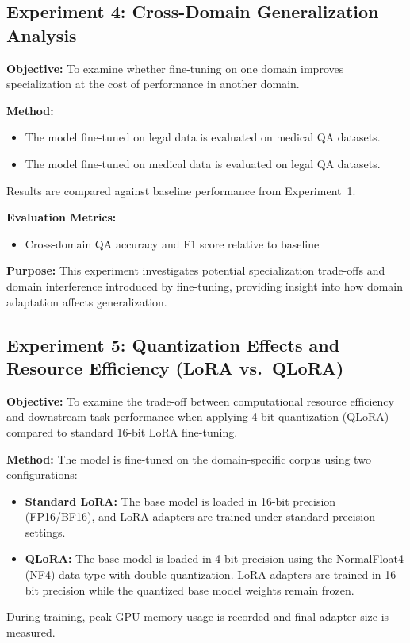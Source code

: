 \documentclass[12pt, letterpaper]{article}
\begin{document}

\subsection{Experiment 4: Cross-Domain Generalization Analysis}

\textbf{Objective:} To examine whether fine-tuning on one domain improves specialization at the cost of performance in another domain.

\textbf{Method:}
\begin{itemize}
    \item The model fine-tuned on legal data is evaluated on medical QA datasets.
    \item The model fine-tuned on medical data is evaluated on legal QA datasets.
\end{itemize}
Results are compared against baseline performance from Experiment~1.

\textbf{Evaluation Metrics:}
\begin{itemize}
    \item Cross-domain QA accuracy and F1 score relative to baseline
\end{itemize}

\textbf{Purpose:} This experiment investigates potential specialization trade-offs and domain interference introduced by fine-tuning, providing insight into how domain adaptation affects generalization.


\subsection{Experiment 5: Quantization Effects and Resource Efficiency (LoRA vs.\ QLoRA)}

\textbf{Objective:} To examine the trade-off between computational resource efficiency and downstream task performance when applying 4-bit quantization (QLoRA) compared to standard 16-bit LoRA fine-tuning.

\textbf{Method:} The model is fine-tuned on the domain-specific corpus using two configurations:
\begin{itemize}
    \item \textbf{Standard LoRA:} The base model is loaded in 16-bit precision (FP16/BF16), and LoRA adapters are trained under standard precision settings.
    \item \textbf{QLoRA:} The base model is loaded in 4-bit precision using the NormalFloat4 (NF4) data type with double quantization. LoRA adapters are trained in 16-bit precision while the quantized base model weights remain frozen.
\end{itemize}
During training, peak GPU memory usage is recorded and final adapter size is measured.
\end{document}
